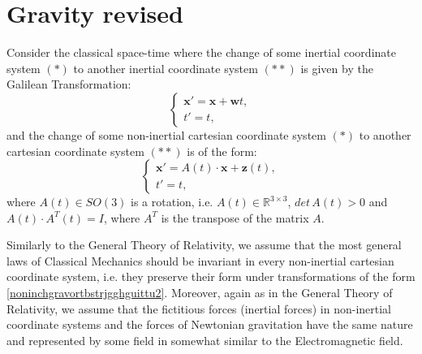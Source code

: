 \documentclass{article}
\theoremstyle{definition}
\theoremstyle{remark}
\renewcommand{\vec}[1]{\mathbf{#1}}
\newcommand{\R}{\mathbb{R}}
\newcommand{\er}{\eqref}
\newcommand{\R}{{\mathbb{R}}}
\newcommand{\er}{\eqref}
\begin{document}
\section{Gravity revised}\label{gugyu} Consider the classical space-time
where the change of some inertial coordinate system $(*)$ to another
inertial coordinate system $(**)$ is given by the Galilean
Transformation:
\begin{equation}\label{noninchgravortbstrjgghguittu1}
\begin{cases}
\vec x'=\vec x+\vec wt,\\
t'=t,
\end{cases}
\end{equation}
and the change of some non-inertial cartesian coordinate system
$(*)$ to another cartesian coordinate system $(**)$ is of the form:
\begin{equation}\label{noninchgravortbstrjgghguittu2}
\begin{cases}
\vec x'=A(t)\cdot\vec x+\vec z(t),\\
t'=t,
\end{cases}
\end{equation}
where $A(t)\in SO(3)$ is a rotation, i.e. $A(t)\in \R^{3\times 3}$,
$det\, A(t)>0$ and $A(t)\cdot A^T(t)=I$, where $A^T$ is the
transpose of the matrix $A$.

 Similarly to the General Theory of Relativity, we assume that
the most general laws of Classical Mechanics should be invariant in
every non-inertial cartesian coordinate system, i.e. they preserve
their form under transformations of the form
\er{noninchgravortbstrjgghguittu2}. Moreover, again as in the
General Theory of Relativity, we assume that the fictitious forces
(inertial forces) in non-inertial coordinate systems and the forces
of Newtonian gravitation have the same nature and represented by
some field in somewhat similar to the Electromagnetic field.
\end{document}
